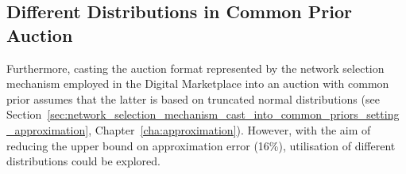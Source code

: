 \subsection{Different Distributions in Common Prior Auction}
\label{sub:different_distributions_in_common_prior_auction_conclusions}
Furthermore, casting the auction format represented by the network selection mechanism employed in the Digital Marketplace into an auction with common prior assumes that the latter is based on truncated normal distributions (see Section~\ref{sec:network_selection_mechanism_cast_into_common_priors_setting_approximation}, Chapter~\ref{cha:approximation}). However, with the aim of reducing the upper bound on approximation error (16\%), utilisation of different distributions could be explored.

